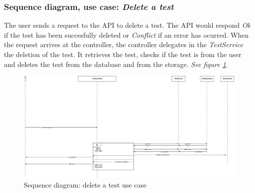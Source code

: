         \subsubsection{Sequence diagram, use case: \textit{Delete a test}}
            The user sends a request to the API to delete a test. The API would respond \textit{Ok} if the test has been succesfully deleted or \textit{Conflict} if an error has ocurred.
            When the request arrives at the controller, the controller delegates in the \textit{TestService} the deletion of the test. It retrieves the test, checks if the test is from the user and deletes the test from the database and from the storage.
            \textit{See figure \ref{fig:implementation_deletetest}}.
                \begin{figure}[H]
                    \centering
                        \includegraphics[width=\textwidth]{assets/diagrams/deletetest.png}
                    \caption{Sequence diagram: delete a test use case}
                    \label{fig:implementation_deletetest}
                \end{figure}

